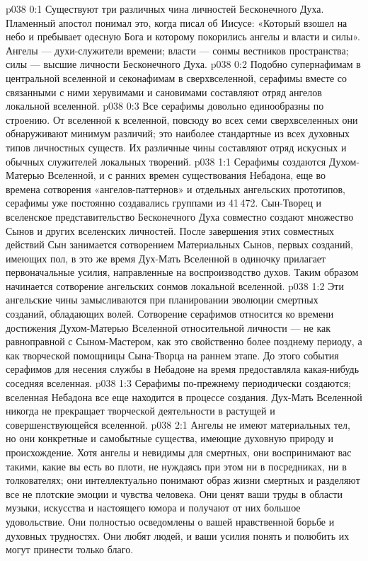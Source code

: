 \author{Мелхиседек}
\vs p038 0:1 Существуют три различных чина личностей Бесконечного Духа. Пламенный апостол понимал это, когда писал об Иисусе: «Который взошел на небо и пребывает одесную Бога и которому покорились ангелы и власти и силы». Ангелы --- духи\hyp{}служители времени; власти --- сонмы вестников пространства; силы --- высшие личности Бесконечного Духа.
\vs p038 0:2 \pc Подобно супернафимам в центральной вселенной и секонафимам в сверхвселенной, серафимы вместе со связанными с ними херувимами и сановимами составляют отряд ангелов локальной вселенной.
\vs p038 0:3 Все серафимы довольно единообразны по строению. От вселенной к вселенной, повсюду во всех семи сверхвселенных они обнаруживают минимум различий; это наиболее стандартные из всех духовных типов личностных существ. Их различные чины составляют отряд искусных и обычных служителей локальных творений.
\vs p038 1:1 Серафимы создаются Духом\hyp{}Матерью Вселенной, и с ранних времен существования Небадона, еще во времена сотворения «ангелов\hyp{}паттернов» и отдельных ангельских прототипов, серафимы уже постоянно создавались группами из 41\,472. Сын\hyp{}Творец и вселенское представительство Бесконечного Духа совместно создают множество Сынов и других вселенских личностей. После завершения этих совместных действий Сын занимается сотворением Материальных Сынов, первых созданий, имеющих пол, в это же время Дух\hyp{}Мать Вселенной в одиночку прилагает первоначальные усилия, направленные на воспроизводство духов. Таким образом начинается сотворение ангельских сонмов локальной вселенной.
\vs p038 1:2 Эти ангельские чины замысливаются при планировании эволюции смертных созданий, обладающих волей. Сотворение серафимов относится ко времени достижения Духом\hyp{}Матерью Вселенной относительной личности --- не как равноправной с Сыном\hyp{}Мастером, как это свойственно более позднему периоду, а как творческой помощницы Сына\hyp{}Творца на раннем этапе. До этого события серафимов для несения службы в Небадоне на время предоставляла какая\hyp{}нибудь соседняя вселенная.
\vs p038 1:3 Серафимы по\hyp{}прежнему периодически создаются; вселенная Небадона все еще находится в процессе создания. Дух\hyp{}Мать Вселенной никогда не прекращает творческой деятельности в растущей и совершенствующейся вселенной.
\vs p038 2:1 Ангелы не имеют материальных тел, но они конкретные и самобытные существа, имеющие духовную природу и происхождение. Хотя ангелы и невидимы для смертных, они воспринимают вас такими, какие вы есть во плоти, не нуждаясь при этом ни в посредниках, ни в толкователях; они интеллектуально понимают образ жизни смертных и разделяют все не плотские эмоции и чувства человека. Они ценят ваши труды в области музыки, искусства и настоящего юмора и получают от них большое удовольствие. Они полностью осведомлены о вашей нравственной борьбе и духовных трудностях. Они любят людей, и ваши усилия понять и полюбить их могут принести только благо.
